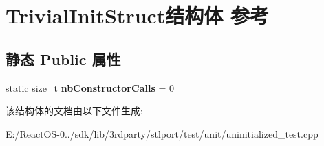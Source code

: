 \hypertarget{struct_trivial_init_struct}{}\section{Trivial\+Init\+Struct结构体 参考}
\label{struct_trivial_init_struct}
\subsection*{静态 Public 属性}
\begin{DoxyCompactItemize}
\item 
\mbox{\label{struct_trivial_init_struct_a5fde86f5796cf318b4196b79e415e5a0}} 
static size\+\_\+t {\bfseries nb\+Constructor\+Calls} = 0
\end{DoxyCompactItemize}


该结构体的文档由以下文件生成\+:\begin{DoxyCompactItemize}
\item 
E\+:/\+React\+O\+S-\/0../sdk/lib/3rdparty/stlport/test/unit/uninitialized\+\_\+test.\+cpp\end{DoxyCompactItemize}
